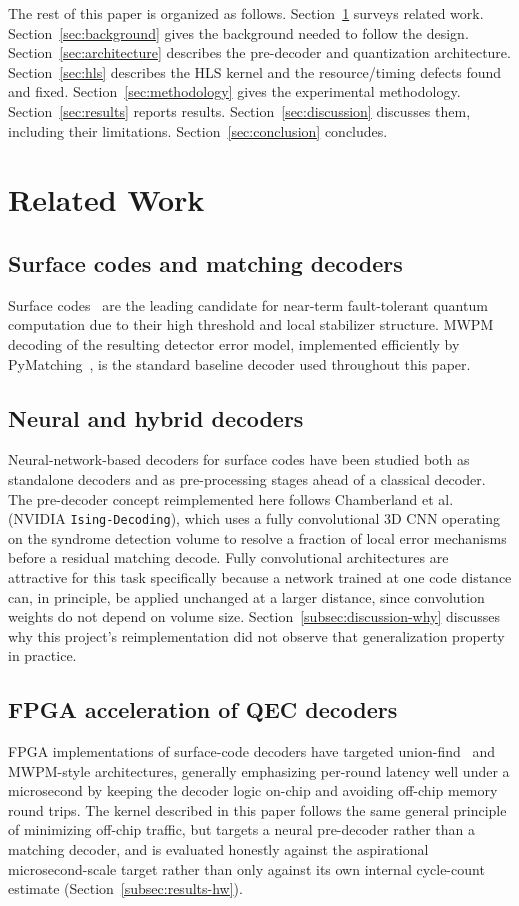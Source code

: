 \documentclass[conference]{IEEEtran}
\begin{document}
The rest of this paper is organized as follows. Section~\ref{sec:related} surveys related work. Section~\ref{sec:background} gives the background needed to follow the design. Section~\ref{sec:architecture} describes the pre-decoder and quantization architecture. Section~\ref{sec:hls} describes the HLS kernel and the resource/timing defects found and fixed. Section~\ref{sec:methodology} gives the experimental methodology. Section~\ref{sec:results} reports results. Section~\ref{sec:discussion} discusses them, including their limitations. Section~\ref{sec:conclusion} concludes.

\section{Related Work}
\label{sec:related}

\subsection{Surface codes and matching decoders}
Surface codes~\cite{fowler2012surface} are the leading candidate for near-term fault-tolerant quantum computation due to their high threshold and local stabilizer structure. MWPM decoding of the resulting detector error model, implemented efficiently by PyMatching~\cite{higgott2022pymatching}, is the standard baseline decoder used throughout this paper.

\subsection{Neural and hybrid decoders}
Neural-network-based decoders for surface codes have been studied both as standalone decoders and as pre-processing stages ahead of a classical decoder. The pre-decoder concept reimplemented here follows Chamberland et al.~\cite{chamberland2026fast} (NVIDIA \texttt{Ising-Decoding}), which uses a fully convolutional 3D CNN operating on the syndrome detection volume to resolve a fraction of local error mechanisms before a residual matching decode. Fully convolutional architectures are attractive for this task specifically because a network trained at one code distance can, in principle, be applied unchanged at a larger distance, since convolution weights do not depend on volume size. Section~\ref{subsec:discussion-why} discusses why this project's reimplementation did not observe that generalization property in practice.

\subsection{FPGA acceleration of QEC decoders}
FPGA implementations of surface-code decoders have targeted union-find~\cite{das2022afs} and MWPM-style architectures, generally emphasizing per-round latency well under a microsecond by keeping the decoder logic on-chip and avoiding off-chip memory round trips. The kernel described in this paper follows the same general principle of minimizing off-chip traffic, but targets a neural pre-decoder rather than a matching decoder, and is evaluated honestly against the aspirational microsecond-scale target rather than only against its own internal cycle-count estimate (Section~\ref{subsec:results-hw}).
\end{document}
